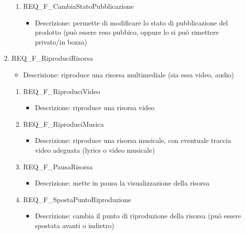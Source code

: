 \begin{enumerate}
\begin{enumerate}[label*=\arabic*.]
		\item REQ\_F\_CambiaStatoPubblicazione
		\begin{itemize}
			\item Descrizione: permette di modificare lo stato di pubblicazione del prodotto (può essere reso pubbico, oppure lo si può rimettere privato/in bozza)
		\end{itemize}		

	\end{enumerate}
	
	\item REQ\_F\_RiproduciRisorsa
		\begin{itemize}
			\item Descrizione: riproduce una risorsa multimediale (sia essa video, audio)
		\end{itemize}
    		\begin{enumerate}[label*=\arabic*.]      				
			\item REQ\_F\_RiproduciVideo
				\begin{itemize}
					\item Descrizione: riproduce una risorsa video
				\end{itemize}
			\item REQ\_F\_RiproduciMusica
				\begin{itemize}
					\item Descrizione: riproduce una risorsa musicale, con eventuale traccia video adeguata (lyrics o video musicale)
				\end{itemize}
			
			\item REQ\_F\_PausaRisorsa
				\begin{itemize}
					\item Descrizione: mette in pausa la visualizzazione della risorsa
				\end{itemize}
			
			\item REQ\_F\_SpostaPuntoRiproduzione
				\begin{itemize}
					\item Descrizione: cambia il punto di riproduzione della risorsa (può essere spostata avanti o indietro)
				\end{itemize}		
		\end{enumerate}
		

\end{enumerate}
